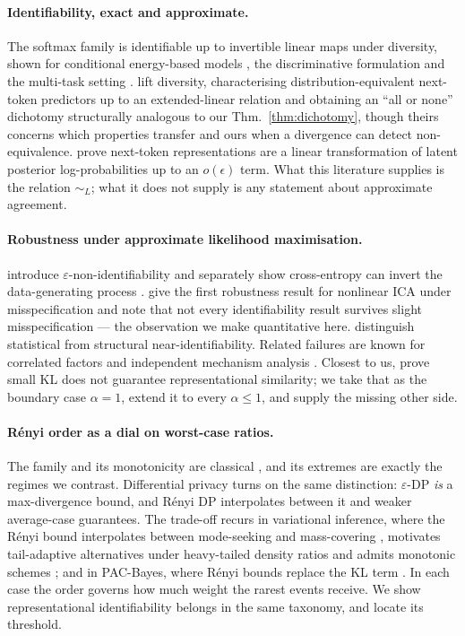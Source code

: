 \documentclass[10pt,letterpaper,twocolumn]{article}
\newcommand{\simL}{\sim_{L}}
\theoremstyle{plain}
\theoremstyle{definition}
\theoremstyle{remark}
\begin{document}
\paragraph{Identifiability, exact and approximate.}
The softmax family is identifiable up to invertible linear maps under
diversity, shown for conditional energy-based models
\citep{khemakhem2020icebeem}, the discriminative formulation
\citep{roeder2021} and the multi-task setting \citep{lachapelle2023}.
\citet{marconato2025} lift diversity, characterising distribution-equivalent
next-token predictors up to an extended-linear relation and obtaining an ``all
or none'' dichotomy structurally analogous to our Thm.~\ref{thm:dichotomy},
though theirs concerns which properties transfer and ours when a divergence can
detect non-equivalence. \citet{liu2026} prove next-token representations are a
linear transformation of latent posterior log-probabilities up to an
$o(\epsilon)$ term. What this literature supplies is the relation $\simL$; what
it does not supply is any statement about approximate agreement.

\paragraph{Robustness under approximate likelihood maximisation.}
\citet{reizinger2024} introduce $\varepsilon$-non-identifiability and
separately show cross-entropy can invert the data-generating process
\citep{reizinger2025}. \citet{buchholz2024} give the first robustness result
for nonlinear ICA under misspecification and note that not every identifiability
result survives slight misspecification --- the observation we make
quantitative here. \citet{nelson2026} distinguish statistical from structural
near-identifiability. Related failures are known for correlated factors
\citep{trauble2021} and independent mechanism analysis \citep{sliwa2022}.
Closest to us, \citet{nielsen2025} prove small KL does not guarantee
representational similarity; we take that as the boundary case $\alpha=1$,
extend it to every $\alpha\le1$, and supply the missing other side.

\paragraph{R\'enyi order as a dial on worst-case ratios.}
The family and its monotonicity are classical \citep{vanerven2014}, and its
extremes are exactly the regimes we contrast. Differential privacy turns on the
same distinction: $\varepsilon$-DP \emph{is} a max-divergence bound, and
R\'enyi DP \citep{mironov2017} interpolates between it and weaker average-case
guarantees. The trade-off recurs in variational inference, where the R\'enyi
bound interpolates between mode-seeking and mass-covering
\citep{li2016}, motivates tail-adaptive alternatives under heavy-tailed density
ratios \citep{wang2018} and admits monotonic schemes \citep{daudel2023}; and in
PAC-Bayes, where R\'enyi bounds replace the KL term \citep{begin2016}. In each
case the order governs how much weight the rarest events receive. We show
representational identifiability belongs in the same taxonomy, and locate its
threshold.
\end{document}
